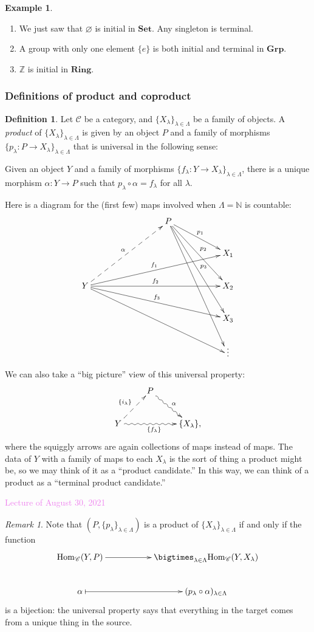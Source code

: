 \documentclass{amsart}[12pt]
\newcommand{\Hom}{\mathrm{Hom}}
\def\sC{\mathscr C}
\newcommand{\Aug}[1]{\textcolor{violet}{Lecture of August #1, 2021}}
\newcommand{\Z}{\mathbb{Z}}
\newcommand{\N}{\mathbb{N}}
\newcommand{\DEF}[1]{\emph{#1}\index{#1}}
\numberwithin{equation}{section}
\theoremstyle{plain} %
\theoremstyle{definition}
\newtheorem{defn}[equation]{Definition}
\newtheorem{ex}[equation]{Example}
\theoremstyle{remark}
\newtheorem{rem}[equation]{Remark}
\newcommand{\sssec}[1]{\subsubsection{#1}}
\newcommand{\Set}{\mathbf{Set}}
\newcommand{\Grp}{\mathbf{Grp}}
\newcommand{\Ring}{\mathbf{Ring}}
\begin{document}
\begin{ex}
\begin{enumerate} \item We just saw that $\varnothing$ is initial in $\Set$. Any singleton is terminal.
\item A group with only one element $\{e\}$ is both initial and terminal in $\Grp$.
\item $\Z$ is initial in $\Ring$.
\end{enumerate}
\end{ex}


\sssec{Definitions of product and coproduct}

\begin{defn} Let $\sC$ be a category, and $\{ X_\lambda\}_{\lambda\in \Lambda}$ be a family of objects. A \DEF{product} of $\{ X_\lambda\}_{\lambda\in \Lambda}$ is given by an object $P$ and a family of morphisms $\{p_\lambda : P \to X_\lambda\}_{\lambda\in \Lambda}$ that is universal in the following sense:

Given an object $Y$ and a family of morphisms $\{f_\lambda:Y\to X_\lambda\}_{\lambda\in \Lambda}$, there is a unique morphism $\alpha: Y\to P$ such that $p_\lambda \circ \alpha = f_\lambda$ for all $\lambda$.
\end{defn}

Here is a diagram for the (first few) maps involved when $\Lambda=\N$ is countable:
\[\xymatrix{  & & & P \ar[drr]^-{p_1} \ar[ddrr]^-{p_2} \ar[dddrr]^-{p_3} \ar[ddddrr]  & & \\
 & & & & & X_1\\
Y \ar@{-->}[uurrr]^-{\alpha}\ar[urrrrr]^-{f_1}  \ar[rrrrr]^-{f_2} \ar[drrrrr]^-{f_3} \ar[ddrrrrr]&  & & & & X_2\\
& & & & & X_3\\
& & & & & \vdots }\]

We can also take a ``big picture'' view of this universal property:
\[\xymatrix{ & P\ar@{~>}[dr]^{\alpha} & \\
Y \ar@{-->}[ur]^{\{i_\lambda\}} \ar@{~>}[rr]_{\{f_\lambda\}} & & \{X_{\lambda}\},}\]
where the squiggly arrows are again collections of maps instead of maps. The data of $Y$ with a family of maps to each $X_\lambda$ is the sort of thing a product might be, so we may think of it as a ``product candidate.'' In this way, we can think of a product as a ``terminal product candidate.''

\Aug{30}

\begin{rem}
Note that $(P,\{p_\lambda\}_{\lambda\in\Lambda})$ is a product of $\{ X_\lambda\}_{\lambda\in \Lambda}$ if and only if the function
\[ \xymatrix{ \Hom_{\sC}(Y,P) \ar[rr] & & \bigtimes_{\lambda\in\Lambda} \Hom_{\sC}(Y,X_\lambda)\\
\alpha \ar@{|->}[rr] & &  ( p_\lambda \circ \alpha )_{\lambda\in \Lambda}}\]
is a bijection: the universal property says that everything in the target comes from a unique thing in the source.
\end{rem}
\end{document}
